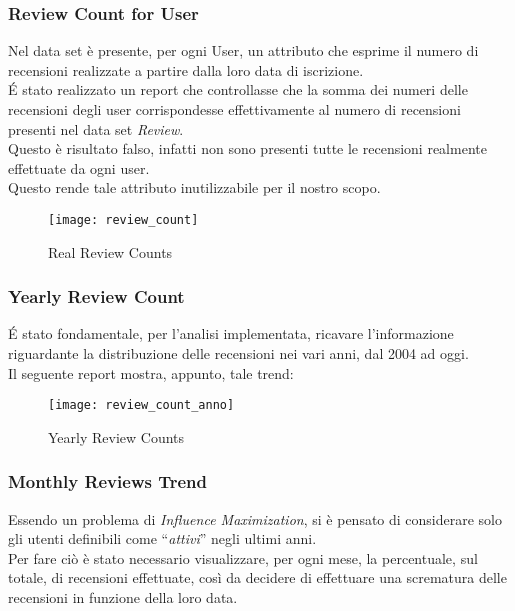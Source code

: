 \subsubsection{Review Count for User}
Nel data set è presente, per ogni User, un attributo che esprime il numero di
recensioni realizzate a partire dalla loro data di iscrizione.\\
\'E stato realizzato un report che controllasse che la somma dei numeri  delle
recensioni degli user corrispondesse effettivamente al numero di recensioni
presenti nel data set \textit{Review}.\\
Questo è risultato falso, infatti non sono presenti tutte le recensioni
realmente effettuate da ogni user.\\
Questo rende tale attributo inutilizzabile per il nostro scopo.\\

\begin{figure}[!htbp]
	\texttt{[image: review\_count]}
	\caption{Real Review Counts}
	\label{review_count}
\end{figure}

\subsubsection{Yearly Review Count}
\'E stato fondamentale, per l'analisi implementata, ricavare l'informazione riguardante la distribuzione delle
recensioni nei vari anni, dal 2004 ad oggi.\\
Il seguente report mostra, appunto, tale trend:\\

\begin{figure}[!htbp]
	\texttt{[image: review\_count\_anno]}
	\caption{Yearly Review Counts}
	\label{review_count_anno}
\end{figure}

\clearpage

\subsubsection{Monthly Reviews Trend}
Essendo un problema di \textit{Influence Maximization}, si è pensato di
considerare solo gli utenti definibili come ``\textit{attivi}'' negli ultimi anni.\\
Per fare ciò è stato necessario visualizzare, per ogni mese, la percentuale, sul
totale, di recensioni effettuate, così da decidere di effettuare una scrematura
delle recensioni in funzione della loro data.

